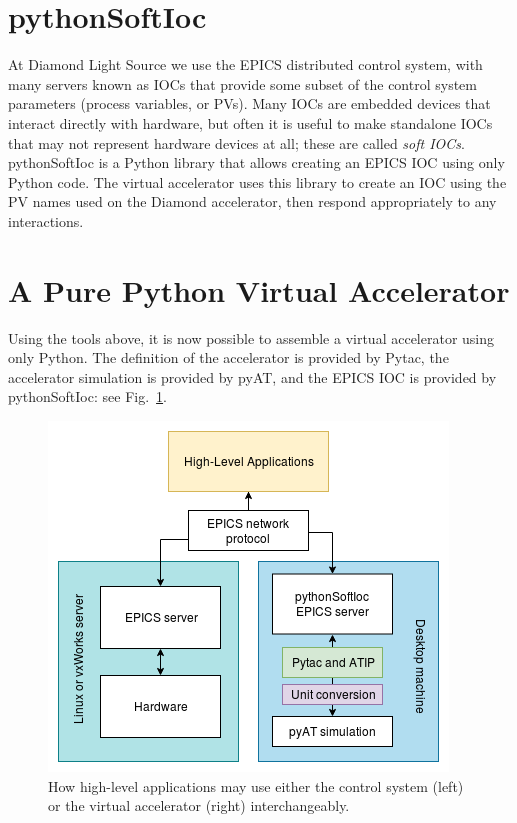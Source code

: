 \documentclass[a4paper,
               keeplastbox,   %
               ]{jacow}
\begin{document}
\section{pythonSoftIoc}

At Diamond Light Source we use the EPICS distributed control system, with many
servers known as IOCs that provide some subset of the control system parameters
(process variables, or PVs). Many IOCs are embedded devices that interact
directly with hardware, but often it is useful to make standalone IOCs that may
not represent hardware devices at all; these are called \textit{soft IOCs}.
pythonSoftIoc \cite{pythonioc} is a Python library that allows creating an EPICS IOC
using only Python code. The virtual accelerator uses this library to create
an IOC using the PV names used on the Diamond accelerator, then respond
appropriately to any interactions.

\section{A Pure Python Virtual Accelerator}

Using the tools above, it is now possible to assemble a virtual accelerator
using only Python. The definition of the accelerator is provided by Pytac,
the accelerator simulation is provided by pyAT, and the EPICS IOC is provided by 
pythonSoftIoc: see Fig.~\ref{fig:virtac}.

\begin{figure}[!hbt]
    \centering
    \includegraphics*[width=\columnwidth]{MOPHA017f3}
    \caption{How high-level applications may use either the control system (left) or the virtual accelerator (right) interchangeably.}
    \label{fig:virtac}
\end{figure}
\end{document}

